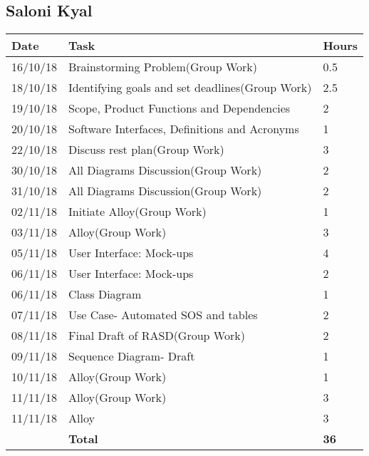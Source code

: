 \subsection{Saloni Kyal}
\begin{table}[H]
	\centering
    \begin{tabular}{|l|l|l|}
    \hline
     \textbf{Date} & \textbf{Task} & \textbf{Hours}\\
    \hline
    16/10/18 & Brainstorming Problem(Group Work) & 0.5\\
    \hline
    18/10/18 & Identifying goals and set deadlines(Group Work) & 2.5\\
    \hline
    19/10/18 & Scope, Product Functions and Dependencies & 2\\
    \hline
    20/10/18 & Software Interfaces, Definitions and Acronyms & 1\\
    \hline
22/10/18 & Discuss rest plan(Group Work) & 3\\
\hline
30/10/18 & All Diagrams Discussion(Group Work) & 2\\
\hline
31/10/18 & All Diagrams Discussion(Group Work) & 2\\
\hline
02/11/18 & Initiate Alloy(Group Work) & 1\\
\hline
03/11/18 & Alloy(Group Work) & 3\\
\hline
05/11/18 & User Interface: Mock-ups & 4\\
\hline
06/11/18 & User Interface: Mock-ups & 2\\
\hline
06/11/18 & Class Diagram & 1\\
\hline
07/11/18 &	Use Case- Automated SOS and tables & 2\\
\hline
08/11/18 &	Final Draft of RASD(Group Work) &	2\\
\hline
09/11/18 &	Sequence Diagram- Draft &	1\\
\hline
10/11/18 &	Alloy(Group Work) &	1\\
\hline
11/11/18 &	Alloy(Group Work) &	3\\
\hline
11/11/18 &	Alloy &	3\\
\hline
	& \textbf{Total}	& \textbf{36}\\  
 \hline
    \end{tabular}
\end{table}

